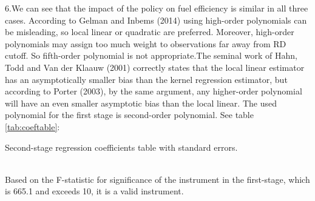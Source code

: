 \documentclass{article}
\begin{document}
6.We can see that the impact of the policy on fuel efficiency is similar in all three cases. According to Gelman and Inbems (2014) using high-order polynomials can be misleading, so local linear or quadratic are preferred. Moreover, high-order polynomials may assign too much weight to observations far away from RD cutoff. So fifth-order polynomial is not appropriate.The seminal work of Hahn, Todd and Van der Klaauw (2001) correctly states that the local linear estimator has an asymptotically smaller bias than the kernel regression estimator, but according to Porter (2003), by the same argument, any higher-order polynomial will have an even smaller asymptotic bias than the local linear. The used polynomial for the first stage is second-order polynomial. See table \ref{tab:coeftable}:

\begin{table}[h]
    \centering
    
    \caption{Second-stage regression coefficients table with standard errors.}
    \label{tab:coeftable}
\end{table}
\\
Based on the F-statistic for significance of the instrument in the first-stage, which is 665.1 and exceeds 10, it is a valid instrument.
\end{document}
